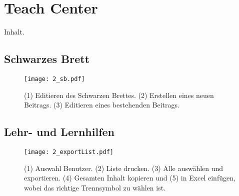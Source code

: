 \chapter{Teach Center}

Inhalt.

\section{Schwarzes Brett}

\begin{figure}[htbp]
  \texttt{[image: 2\_sb.pdf]}
  \caption{ (1) Editieren des Schwarzen Brettes. (2) Erstellen eines neuen
    Beitrags. (3) Editieren eines bestehenden Beitrags.}
\end{figure}

\section{Lehr- und Lernhilfen}

\begin{figure}[htbp]
  \texttt{[image: 2\_exportList.pdf]}
  \caption{ (1) Auswahl Benutzer. (2) Liste drucken. (3) Alle ausw\"{a}hlen und
    exportieren. (4) Gesamten Inhalt kopieren und (5) in Excel einf\"{u}gen,
    wobei das richtige Trennsymbol zu w\"{a}hlen ist.}
\end{figure}

